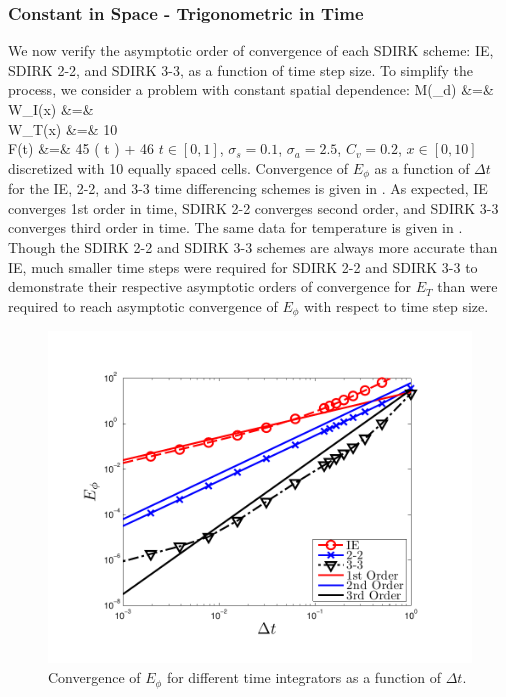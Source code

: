 \newpage

\subsubsection{Constant in Space - Trigonometric in Time}
\label{sec:time_convergence}


We now verify the asymptotic order of convergence of each SDIRK scheme: IE,  SDIRK 2-2, and SDIRK 3-3, as a function of time step size.
To simplify the process, we consider a problem with constant spatial dependence:
\beanum
M(\mu_d) &=&  \\
W_I(x) &=&  \\
W_T(x) &=&  10 \\
F(t) &=& 45 \cos\left( \pi t \right) + 46 \pec
\eeanum
$t \in[0,1]$, $\sigma_s = 0.1$, $\sigma_a = 2.5$, $C_v = 0.2$, $x\in[0,10]$ discretized with 10 equally spaced cells.  Convergence of $E_{\phi}$ as a function of $\Delta t$ for the IE, 2-2, and 3-3 time differencing schemes is given in .
As expected, IE converges 1st order in time, SDIRK 2-2 converges second order, and SDIRK 3-3 converges third order in time.
The same data for temperature is given in .  
Though the SDIRK 2-2 and SDIRK 3-3 schemes are always more accurate than IE, much smaller time steps were required for SDIRK  2-2 and SDIRK 3-3 to demonstrate their respective asymptotic orders of convergence for $E_T$ than were required to reach asymptotic convergence of $E_{\phi}$ with respect to time step size.
\begin{figure}[!htp]
\centering
\includegraphics[width=12cm,trim=0.25in  0.2in 0.75in 0.5in,clip=true]{chapter6_grey_radtran/Dissertation_Data/Time_Integrators_Convergence_Phi.pdf}
\caption{Convergence of $E_{\phi}$ for different time integrators as a function of $\Delta t$.}
\label{fig:e_phi_time}
\end{figure}
